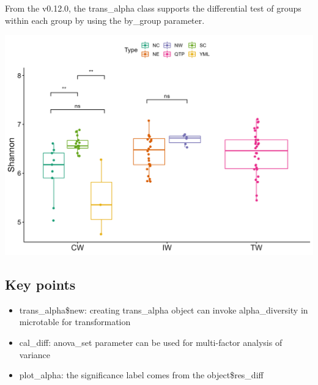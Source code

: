 \documentclass[
]{book}
\newenvironment{Shaded}{\begin{snugshade}}{\end{snugshade}}
\newcommand{\AttributeTok}[1]{\textcolor[rgb]{0.77,0.63,0.00}{#1}}
\newcommand{\FunctionTok}[1]{\textcolor[rgb]{0.00,0.00,0.00}{#1}}
\newcommand{\NormalTok}[1]{#1}
\newcommand{\OtherTok}[1]{\textcolor[rgb]{0.56,0.35,0.01}{#1}}
\newcommand{\SpecialCharTok}[1]{\textcolor[rgb]{0.00,0.00,0.00}{#1}}
\newcommand{\StringTok}[1]{\textcolor[rgb]{0.31,0.60,0.02}{#1}}
\providecommand{\tightlist}{%
  \setlength{\itemsep}{0pt}\setlength{\parskip}{0pt}}
\begin{document}
From the v0.12.0, the trans\_alpha class supports the differential test of groups within each group by using the by\_group parameter.

\begin{Shaded}
\end{Shaded}

\begin{center}\includegraphics[width=600px]{Images/plot_alpha_wilcox_bygroup} \end{center}

\hypertarget{key-points-3}{%
\subsection{Key points}\label{key-points-3}}

\begin{itemize}
\tightlist
\item
  trans\_alpha\$new: creating trans\_alpha object can invoke alpha\_diversity in microtable for transformation
\item
  cal\_diff: anova\_set parameter can be used for multi-factor analysis of variance
\item
  plot\_alpha: the significance label comes from the object\$res\_diff
\end{itemize}
\end{document}
